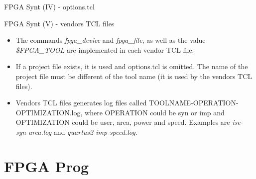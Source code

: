\documentclass{beamer}
\begin{document}
\begin{frame}[fragile]{FPGA Synt (IV) - options.tcl}
  \tiny
  
\end{frame}

\begin{frame}[fragile]{FPGA Synt (V) - vendors TCL files}
  \begin{itemize}
    \item The commands \textit{fpga\_device} and \textit{fpga\_file}, as well
          as the value \textit{\$FPGA\_TOOL} are implemented in each vendor TCL
          file.
    \item If a project file exists, it is used and options.tcl is omitted.
          The name of the project file must be different of the tool name
          (it is used by the vendors TCL files).
    \item Vendors TCL files generates log files called
          TOOLNAME-OPERATION-OPTIMIZATION.log, where OPERATION could be syn or
          imp and OPTIMIZATION could be user, area, power and speed.
          Examples are \textit{ise-syn-area.log} and \textit{quartus2-imp-speed.log}.
  \end{itemize}
\end{frame}


\section{FPGA Prog}
\end{document}
